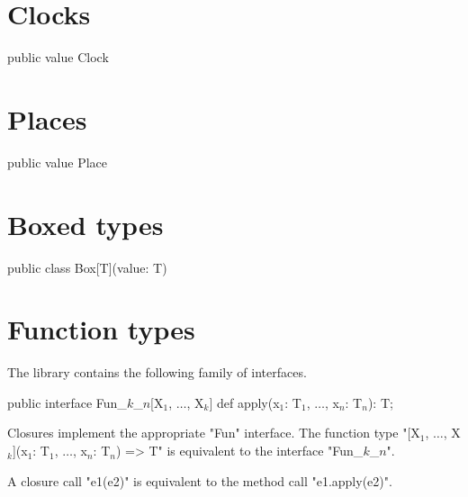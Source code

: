 \section{Clocks}

\begin{xten}
public value Clock { }
\end{xten}

\section{Places}

\begin{xten}
public value Place { }
\end{xten}

\section{Boxed types}

\begin{xten}
public class Box[T](value: T) { }
\end{xten}

\section{Function types}

The library contains the following family of interfaces.

\begin{xtenmath}
public interface Fun_$k$_$n$[X$_1$, $\dots$, X$_k$] {
    def apply(x$_1$: T$_1$, $\dots$, x$_n$: T$_n$): T;
}
\end{xtenmath}

Closures implement the appropriate \xcd"Fun" interface.  The
function type \xcdmath"[X$_1$, $\dots$, X$_k$](x$_1$: T$_1$, $\dots$, x$_n$: T$_n$) => T"
is equivalent to the interface \xcdmath"Fun_$k$_$n$".

A closure call \xcd"e1(e2)" is equivalent to 
the method call \xcd"e1.apply(e2)".
